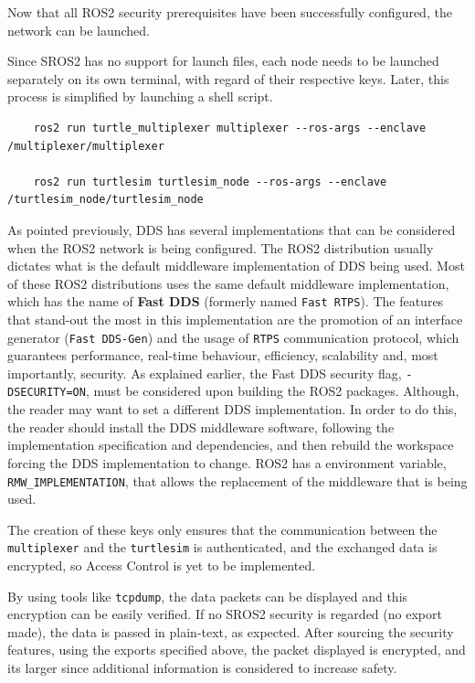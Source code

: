 Now that all ROS2 security prerequisites have been successfully configured, the network can be launched. 

Since SROS2 has no support for launch files, each node needs to be launched separately on its own terminal, with regard of their respective keys. 
Later, this process is simplified by launching a shell script. 
            
\begin{verbatim}
    ros2 run turtle_multiplexer multiplexer --ros-args --enclave /multiplexer/multiplexer
                
    ros2 run turtlesim turtlesim_node --ros-args --enclave /turtlesim_node/turtlesim_node 
\end{verbatim}

As pointed previously, DDS has several implementations that can be considered when the ROS2 network is being configured. The ROS2 distribution usually dictates what is the default middleware implementation of DDS being used. Most of these ROS2 distributions uses the same default middleware implementation, which has the name of \textbf{Fast DDS} (formerly named \texttt{Fast RTPS}). The features that stand-out the most in this implementation are the promotion of an interface generator (\texttt{Fast DDS-Gen}) and the usage of \texttt{RTPS} communication protocol, which guarantees performance, real-time behaviour, efficiency, scalability and, most importantly, security. As explained earlier, the Fast DDS security flag, \texttt{-DSECURITY=ON}, must be considered upon building the ROS2 packages. Although, the reader may want to set a different DDS implementation. In order to do this, the reader should install the DDS middleware software, following the implementation specification and dependencies, and then rebuild the workspace forcing the DDS implementation to change. ROS2 has a environment variable, \texttt{RMW\_IMPLEMENTATION}, that allows the replacement of the middleware that is being used.

The creation of these keys only ensures that the communication between the \texttt{multiplexer} and the \texttt{turtlesim} is authenticated, and the exchanged data is encrypted, so Access Control is yet to be implemented.

By using tools like \texttt{tcpdump}, the data packets can be displayed and this encryption can be easily verified. If no SROS2 security is regarded (no export made), the data is passed in plain-text, as expected. After sourcing the security features, using the exports specified above, the packet displayed is encrypted, and its larger since additional information is considered to increase safety. %


